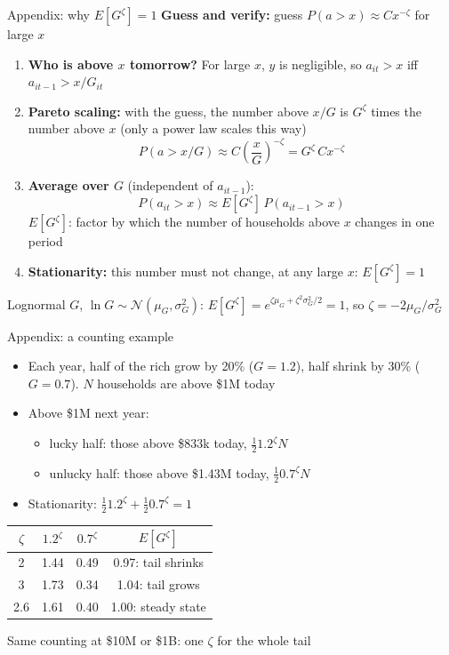 \documentclass[10pt,english,10pt]{beamer}
\begin{document}
\appendix

\begin{frame}[label=route2-proof]{Appendix: why $E[G^{\zeta}]=1$}
\small
\textbf{Guess and verify:} guess $P(a>x)\approx Cx^{-\zeta}$ for large $x$
\begin{enumerate}
\item \textbf{Who is above $x$ tomorrow?} For large $x$, $y$ is negligible, so $a_{it}>x$ iff $a_{it-1}>x/G_{it}$
\item \textbf{Pareto scaling:} with the guess, the number above $x/G$ is $G^{\zeta}$ times the number above $x$ (only a power law scales this way)
\[
P\left(a>x/G\right)\approx C\left(\frac{x}{G}\right)^{-\zeta}=G^{\zeta}\,Cx^{-\zeta}
\]
\item \textbf{Average over $G$} (independent of $a_{it-1}$):
\[
P(a_{it}>x)\approx E\left[G^{\zeta}\right]\,P(a_{it-1}>x)
\]
$E[G^{\zeta}]$: factor by which the number of households above $x$ changes in one period
\item \textbf{Stationarity:} this number must not change, at any large $x$: $\boxed{E\left[G^{\zeta}\right]=1}$
\end{enumerate}
{Lognormal $G$, $\ln G\sim\mathcal{N}(\mu_{G},\sigma_{G}^{2})$: $E[G^{\zeta}]=e^{\zeta\mu_{G}+\zeta^{2}\sigma_{G}^{2}/2}=1$, so $\zeta=-2\mu_{G}/\sigma_{G}^{2}$}
\hfill\hyperlink{route2}{}
\end{frame}

\begin{frame}{Appendix: a counting example}
\begin{itemize}
\item Each year, half of the rich grow by 20\% ($G=1.2$), half shrink by 30\% ($G=0.7$). $N$ households are above \$1M today
\item Above \$1M next year:
\begin{itemize}
\item lucky half: those above \$833k today, $\frac{1}{2}1.2^{\zeta}N$
\item unlucky half: those above \$1.43M today, $\frac{1}{2}0.7^{\zeta}N$
\end{itemize}
\item Stationarity: $\frac{1}{2}1.2^{\zeta}+\frac{1}{2}0.7^{\zeta}=1$
\end{itemize}
{
\begin{center}
\begin{tabular}{cccc}
\toprule
$\zeta$ & $1.2^{\zeta}$ & $0.7^{\zeta}$ & $E[G^{\zeta}]$\\
\midrule
2 & 1.44 & 0.49 & 0.97: tail shrinks\\
3 & 1.73 & 0.34 & 1.04: tail grows\\
2.6 & 1.61 & 0.40 & 1.00: steady state\\
\bottomrule
\end{tabular}
\end{center}}
{Same counting at \$10M or \$1B: one $\zeta$ for the whole tail}
\hfill\hyperlink{route2}{}
\end{frame}
\end{document}
